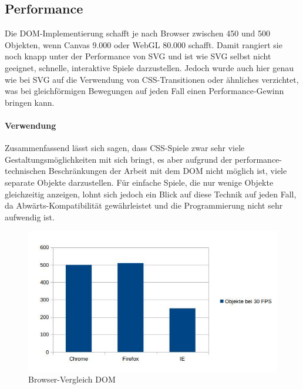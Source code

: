 \documentclass[a4paper, 12pt]{article}
\begin{document}
\subsection{Performance}
Die DOM-Implementierung schafft je nach Browser zwischen 450 und 500 Objekten, wenn Canvas 9.000 oder WebGL 80.000 schafft. Damit rangiert sie noch knapp unter der Performance von SVG und ist wie SVG selbst nicht geeignet, schnelle, interaktive Spiele darzustellen. Jedoch wurde auch hier genau wie bei SVG auf die Verwendung von CSS-Transitionen oder ähnliches verzichtet, was bei gleichförmigen Bewegungen auf jeden Fall einen Performance-Gewinn bringen kann.
\paragraph{Verwendung} Zusammenfassend lässt sich sagen, dass CSS-Spiele zwar sehr viele Gestaltungsmöglichkeiten mit sich bringt, es aber aufgrund der performance-technischen Beschränkungen der Arbeit mit dem DOM nicht möglich ist, viele separate Objekte darzustellen. Für einfache Spiele, die nur wenige Objekte gleichzeitig anzeigen, lohnt sich jedoch ein Blick auf diese Technik auf jeden Fall, da Abwärts-Kompatibilität gewährleistet und die Programmierung nicht sehr aufwendig ist.
\begin{figure}[H]
	\includegraphics[width=\textwidth]{assets/browser_comp_dom} 
	\caption{Browser-Vergleich DOM}
	\label{browser_comp_dom}
\end{figure}
\end{document}
